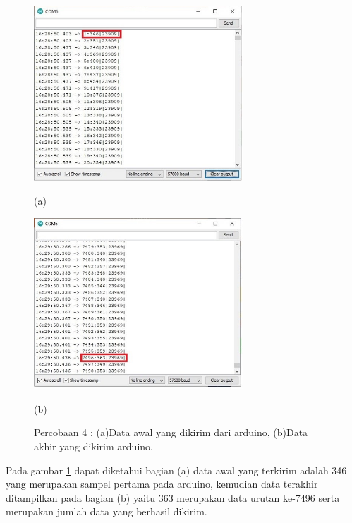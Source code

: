 \begin{figure}[H] \centering
	\includegraphics[width=0.7\textwidth]{img/percob/Slide7}
	
	(a)
	
	\includegraphics[width=0.7\textwidth]{img/percob/Slide8}
	
	(b)
	
	\caption{Percobaan 4 : (a)Data awal yang dikirim dari arduino, (b)Data akhir yang dikirim arduino.}
	\label{fig:4.2.5}
\end{figure}
\vspace{1ex}
Pada gambar \ref{fig:4.2.5} dapat diketahui bagian (a) data awal yang terkirim adalah 346 yang merupakan sampel pertama pada arduino, kemudian data terakhir ditampilkan pada bagian (b) yaitu 363 merupakan data urutan ke-7496 serta merupakan jumlah data yang berhasil dikirim.


